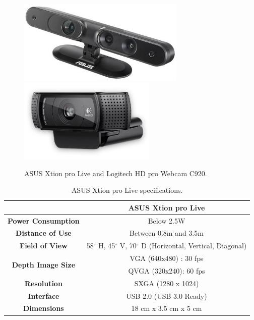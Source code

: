 \begin{figure}[h!]
\begin{center}
\includegraphics[height=4cm]{fig/asusxtionprolive.jpg}
\includegraphics[height=4cm]{fig/logitech-hd-pro-webcam-c920.png}
\end{center}
\caption{ASUS Xtion pro Live and Logitech HD pro Webcam C920.}
\label{fig:cameras}
\end{figure}

\begin{table}[h!]
\begin{center}
\begin{tabular}{|c|c|}
\hline
& \bf{ASUS Xtion pro Live} \\
\hline \bf{ Power Consumption } & Below 2.5W \\
\hline \bf{ Distance of Use } & Between 0.8m and 3.5m \\
\hline \bf{ Field of View } & 58$^{\circ}$ H, 45$^{\circ}$ V, 70$^{\circ}$ D (Horizontal, Vertical, Diagonal) \\
\hline \multirow{2}{*}{\bf{ Depth Image Size }} 
& VGA (640x480) : 30 fps\\
& QVGA (320x240): 60 fps \\
\hline \bf{ Resolution } & SXGA (1280 x 1024)  \\
\hline \bf{ Interface } & USB 2.0 (USB 3.0 Ready) \\
\hline \bf{ Dimensions } & 18 cm x 3.5 cm x 5 cm \\
\hline
\end{tabular}
\end{center}
\caption{ASUS Xtion pro Live specifications.}
\label{tab:xtion}
\end{table}

